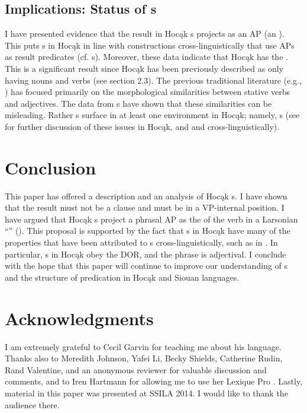 \documentclass[output=paper]{LSP/langsci}
\begin{document}
\subsection{Implications: Status of s}

I have presented evidence that the result  in Hocąk s projects as an AP (an ). This puts s in Hocąk in line with  constructions cross-linguistically that use APs as result predicates (cf.  s). Moreover, these data indicate that Hocąk has the  . This is a significant result since Hocąk has been previously described as only having nouns and verbs (see section 2.3). The previous traditional literature (e.g., \citealt{Helmbrecht2006b}) has focused primarily on the morphological similarities between stative verbs and adjectives. The data from s have shown that these similarities can be misleading. Rather s surface in at least one environment in Hocąk; namely, s (see \citealt{Rosen2014,Rosen2015} for further discussion of these issues in Hocąk, and \citealt{Baker2003} and \citealt{Dixon2004} cross-linguistically).

\section{Conclusion}\label{sec:rosen:6}
This paper has offered a description and an analysis of Hocąk s. I have shown that the result  must not be a clause and must be in a VP-internal position. I have argued that Hocąk s project a phrasal AP as the  of the verb in a Larsonian ``'' (\citealt{Larson1988}). This proposal is supported by the fact that s in Hocąk have many of the properties that have been attributed to s cross-linguistically, such as in . In particular, s in Hocąk obey the DOR, and the  phrase is adjectival. I conclude with the hope that this paper will continue to improve our understanding of s and the structure of predication in Hocąk and Siouan languages.

\section* {Acknowledgments}
I am extremely grateful to Cecil Garvin for teaching me about his language. Thanks also to Meredith Johnson, Yafei Li, Becky Shields, Catherine Rudin, Rand Valentine, and an anonymous reviewer for valuable discussion and comments, and to Iren Hartmann for allowing me to use her Lexique Pro . Lastly, material in this paper was presented at SSILA 2014. I would like to thank the audience there.
\end{document}
